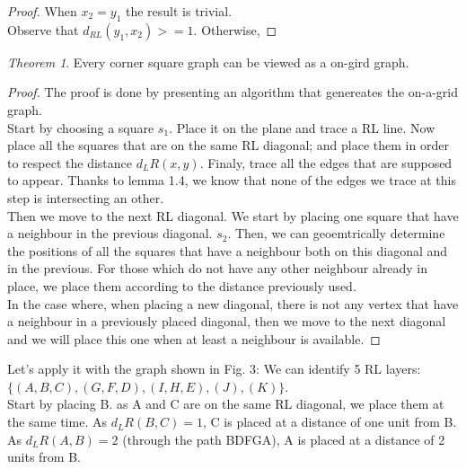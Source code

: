 \documentclass[12pt]{article}
\theoremstyle{definition}
\theoremstyle{remark}
\newtheorem{theorem}{Theorem}[section]
\begin{document}
\begin{proof}
    When $x_2 = y_1$ the result is trivial.\\
    Observe that $d_{RL}(y_1, x_2) >= 1$.
    Otherwise, 
\end{proof}

\begin{theorem}
    Every corner square graph can be viewed as a on-gird graph.
\end{theorem}


\begin{proof}
    The proof is done by presenting an algorithm that genereates the on-a-grid graph.\\
    Start by choosing a square $s_1$. Place it on the plane and trace a RL line. Now place all the squares that are on the same RL diagonal; and place them in order to respect the distance $d_LR(x,y)$.
    Finaly, trace all the edges that are supposed to appear. Thanks to lemma 1.4, we know that none of the edges we trace at this step is intersecting an other. \\
    Then we move to the next RL diagonal. We start by placing one square that have a neighbour in the previous diagonal. $s_2$. Then, we can geoemtrically determine the positions of all the squares that have a neighbour both on this diagonal and in the previous. 
    For those which do not have any other neighbour already in place, we place them according to the distance previously used. \\
    In the case where, when placing a new diagonal, there is not any vertex that have a neighbour in a previously placed diagonal, then we move to the next diagonal and we will place this one when at least a neighbour is available. 

\end{proof}

Let's apply it with the graph shown in Fig. 3:
We can identify 5 RL layers: $\{(A, B, C), (G, F, D), (I, H, E),(J), (K)\}$.\\
Start by placing B. as A and C are on the same RL diagonal, we place them at the same time. As $d_LR(B,C) = 1$, C is placed at a distance of one unit from B.
As $d_LR(A, B) = 2$ (through the path BDFGA), A is placed at a distance of 2 units from B.\\
\end{document}
